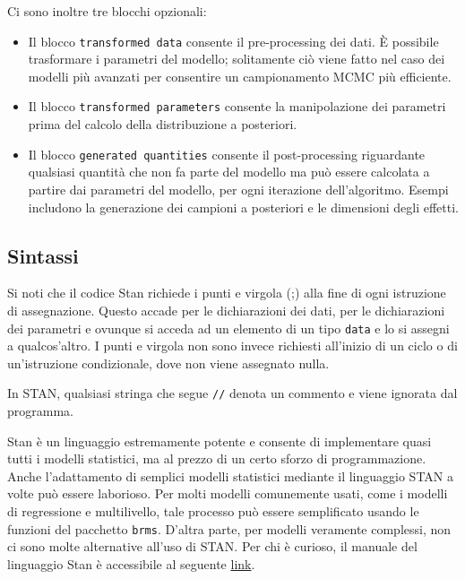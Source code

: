 \documentclass[
  10pt,
  italian,
  a4paper,
  extrafontsizes,onecolumn,openright
  ]{memoir}
\begin{document}
Ci sono inoltre tre blocchi opzionali:

\begin{itemize}
\item
  Il blocco \texttt{transformed\ data} consente il pre-processing dei dati. È possibile trasformare i parametri del modello; solitamente ciò viene fatto nel caso dei modelli più avanzati per consentire un campionamento MCMC più efficiente.
\item
  Il blocco \texttt{transformed\ parameters} consente la manipolazione dei parametri prima del calcolo della distribuzione a posteriori.
\item
  Il blocco \texttt{generated\ quantities} consente il post-processing riguardante qualsiasi quantità che non fa parte del modello ma può essere calcolata a partire dai parametri del modello, per ogni iterazione dell'algoritmo. Esempi includono la generazione dei campioni a posteriori e le dimensioni degli effetti.
\end{itemize}

\hypertarget{sintassi}{%
\subsection{Sintassi}\label{sintassi}}

Si noti che il codice Stan richiede i punti e virgola (;) alla fine di ogni istruzione di assegnazione. Questo accade per le dichiarazioni dei dati, per le dichiarazioni dei parametri e ovunque si acceda ad un elemento di un tipo \texttt{data} e lo si assegni a qualcos'altro. I punti e virgola non sono invece richiesti all'inizio di un ciclo o di un'istruzione condizionale, dove non viene assegnato nulla.

In STAN, qualsiasi stringa che segue \texttt{//} denota un commento e viene ignorata dal programma.

Stan è un linguaggio estremamente potente e consente di implementare quasi tutti i modelli statistici, ma al prezzo di un certo sforzo di programmazione. Anche l'adattamento di semplici modelli statistici mediante il linguaggio STAN a volte può essere laborioso. Per molti modelli comunemente usati, come i modelli di regressione e multilivello, tale processo può essere semplificato usando le funzioni del pacchetto \texttt{brms}. D'altra parte, per modelli veramente complessi, non ci sono molte alternative all'uso di STAN. Per chi è curioso, il manuale del linguaggio Stan è accessibile al seguente \href{https://mc-stan.org/docs/2_27/stan-users-guide/index.html}{link}.
\end{document}
